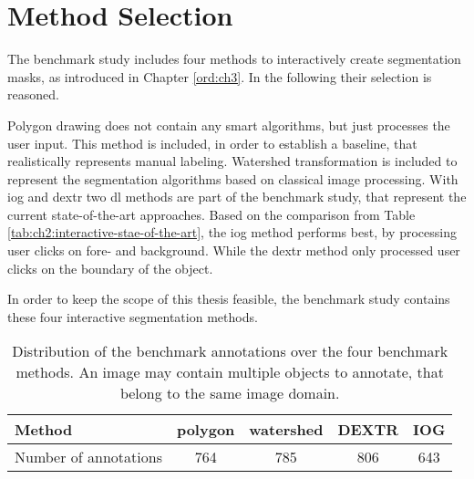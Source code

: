 
\section{Method Selection}\label{ord:ch4:sec2}

The benchmark study includes four methods to interactively create segmentation masks, as introduced in Chapter \ref{ord:ch3}. 
In the following their selection is reasoned.

Polygon drawing does not contain any smart algorithms, but just processes the user input.
This method is included, in order to establish a baseline, that realistically represents manual labeling.
Watershed transformation is included to represent the segmentation algorithms based on classical image processing.
With \gls{iog} and \gls{dextr} two \gls{dl} methods are part of the benchmark study, that represent the current state-of-the-art approaches.
Based on the comparison from Table \ref{tab:ch2:interactive-stae-of-the-art}, the \gls{iog} method performs best, by processing user clicks on fore- and background.
While the \gls{dextr} method only processed user clicks on the boundary of the object.

In order to keep the scope of this thesis feasible, the benchmark study contains these four interactive segmentation methods.

\begin{table}[h!]
	\centering
	\begin{tabular}{l|c c c c}
		Method					& polygon 	& watershed & DEXTR & IOG 	\\
		\hline
		Number of annotations 	& 764 		&  	785		& 806 	& 643 	\\
	\end{tabular}
	\caption[Overview of benchmark methods]{
		Distribution of the benchmark annotations over the four benchmark methods.
		An image may contain multiple objects to annotate, that belong to the same image domain.
	} \label{tab:ch4:methods_overview}
\end{table}
